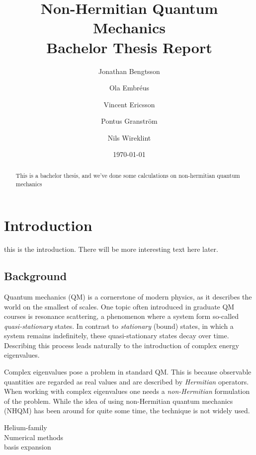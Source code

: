 \documentclass[12pt,a4paper]{report}
\begin{document}
  


\title{Non-Hermitian Quantum Mechanics\\
\Large Bachelor Thesis Report}
\author{Jonathan Bengtsson  \and Ola Embréus \and Vincent Ericsson \and Pontus Granström \and Nils Wireklint}
\date{\today}



\maketitle

\newpage
\begin{abstract}
This is a bachelor thesis, and we've done some calculations on non-hermitian quantum mechanics 
\end{abstract}
\newpage

\tableofcontents

\newpage

\chapter{Introduction}
this is the introduction. There will be more interesting text here later.

\section{Background}

Quantum mechanics (QM) is a cornerstone of modern physics, as it describes the world on the smallest of scales. One topic often introduced in graduate QM courses is resonance scattering, a phenomenon where a system form so-called \emph{quasi-stationary} states. In contrast to \emph{stationary} (bound) states, in which a system remains indefinitely, these quasi-stationary states decay over time. Describing this process leads naturally to the introduction of complex energy eigenvalues. 

Complex eigenvalues pose a problem in standard QM. This is because observable quantities are regarded as real values and are described by \emph{Hermitian} operators. When working with complex eigenvalues one needs a \emph{non-Hermitian} formulation of the problem. While the idea of using non-Hermitian quantum mechanics (NHQM) has been around for quite some time, the technique is not widely used.

{\Large Helium-family \\ Numerical methods\\ basis expansion}
\end{document}
